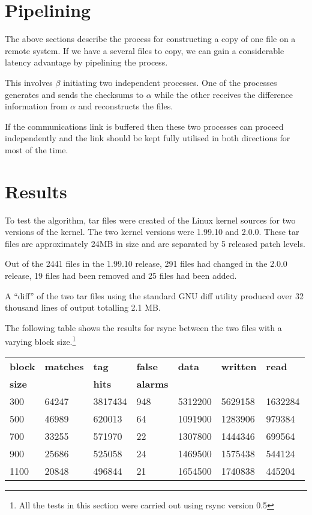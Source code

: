 \documentclass[a4paper]{article}
\begin{document}
\section{Pipelining}

The above sections describe the process for constructing a copy of one
file on a remote system.  If we have a several files to copy, we can
gain a considerable latency advantage by pipelining the process.

This involves $\beta$ initiating two independent processes. One of the
processes generates and sends the checksums to $\alpha$ while the
other receives the difference information from $\alpha$ and
reconstructs the files. 

If the communications link is buffered then these two processes can
proceed independently and the link should be kept fully utilised in
both directions for most of the time. 

\section{Results}

To test the algorithm, tar files were created of the Linux kernel
sources for two versions of the kernel. The two kernel versions were
1.99.10 and 2.0.0. These tar files are approximately 24MB in size and
are separated by 5 released patch levels.

Out of the 2441 files in the 1.99.10 release, 291 files had changed in
the 2.0.0 release, 19 files had been removed and 25 files had been
added.

A ``diff'' of the two tar files using the standard GNU diff utility
produced over 32 thousand lines of output totalling 2.1 MB.

The following table shows the results for rsync between the two files
with a varying block size.\footnote{All the tests in this section were
  carried out using rsync version 0.5}

\vspace*{5mm}
\begin{tabular}{|l|l|l|l|l|l|l|} \hline
{\bf block} & {\bf matches} & {\bf tag}  & {\bf false}  & {\bf data} & {\bf written}  & {\bf read} \\
{\bf size}  &               & {\bf hits} & {\bf alarms} &            &                &            \\ \hline \hline

300         & 64247         & 3817434    & 948          & 5312200    & 5629158        & 1632284   \\ \hline
500         & 46989         & 620013     & 64           & 1091900    & 1283906        & 979384    \\ \hline
700         & 33255         & 571970     & 22           & 1307800    & 1444346        & 699564    \\ \hline
900         & 25686         & 525058     & 24           & 1469500    & 1575438        & 544124    \\ \hline
1100        & 20848         & 496844     & 21           & 1654500    & 1740838        & 445204    \\ \hline
\end{tabular}
\vspace*{5mm}
\end{document}
